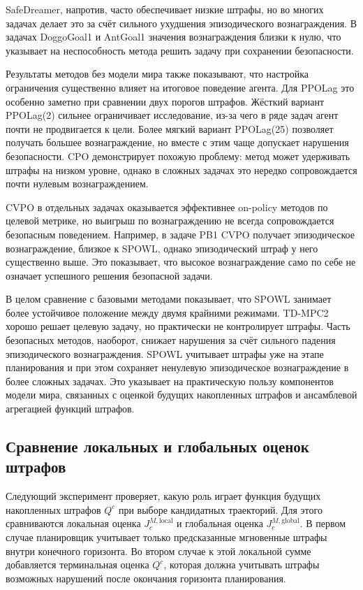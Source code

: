 SafeDreamer, напротив, часто обеспечивает низкие штрафы, но во многих задачах делает это за счёт сильного ухудшения эпизодического вознаграждения. В задачах DoggoGoal1 и AntGoal1 значения вознаграждения близки к нулю, что указывает на неспособность метода решить задачу при сохранении безопасности.

Результаты методов без модели мира также показывают, что настройка ограничения существенно влияет на итоговое поведение агента. Для PPOLag это особенно заметно при сравнении двух порогов штрафов. Жёсткий вариант PPOLag(2) сильнее ограничивает исследование, из-за чего в ряде задач агент почти не продвигается к цели. Более мягкий вариант PPOLag(25) позволяет получать большее вознаграждение, но вместе с этим чаще допускает нарушения безопасности. CPO демонстрирует похожую проблему: метод может удерживать штрафы на низком уровне, однако в сложных задачах это нередко сопровождается почти нулевым вознаграждением.

CVPO в отдельных задачах оказывается эффективнее on-policy методов по целевой метрике, но выигрыш по вознаграждению не всегда сопровождается безопасным поведением. Например, в задаче PB1 CVPO получает эпизодическое вознаграждение, близкое к SPOWL, однако эпизодический штраф у него существенно выше. Это показывает, что высокое вознаграждение само по себе не означает успешного решения безопасной задачи.

В целом сравнение с базовыми методами показывает, что SPOWL занимает более устойчивое положение между двумя крайними режимами. TD-MPC2 хорошо решает целевую задачу, но практически не контролирует штрафы. Часть безопасных методов, наоборот, снижает нарушения за счёт сильного падения эпизодического вознаграждения. SPOWL учитывает штрафы уже на этапе планирования и при этом сохраняет ненулевую эпизодическое вознаграждение в более сложных задачах. Это указывает на практическую пользу компонентов модели мира, связанных с оценкой будущих накопленных штрафов и ансамблевой агрегацией функций штрафов.

\subsection{Сравнение локальных и глобальных оценок штрафов}
\label{subsec:spowl_local_global}

Следующий эксперимент проверяет, какую роль играет функция будущих накопленных штрафов $Q^c$ при выборе кандидатных траекторий. Для этого сравниваются локальная оценка $J^{M,\mathrm{local}}_c$ и глобальная оценка $J^{M,\mathrm{global}}_c$. В первом случае планировщик учитывает только предсказанные мгновенные штрафы внутри конечного горизонта. Во втором случае к этой локальной сумме добавляется терминальная оценка $Q^c$, которая должна учитывать штрафы возможных нарушений после окончания горизонта планирования.

